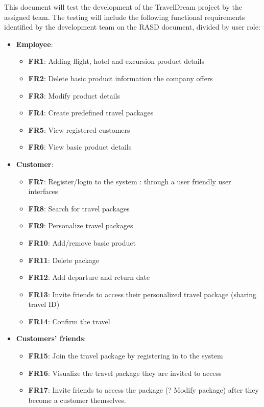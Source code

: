 \documentclass[a4paper,12pt]{book}
\begin{document}
This document will test the development of the TravelDream project by the assigned team. The testing will include the following functional requirements identified by the development team on the RASD document, divided by user role:
\begin{itemize}
  \item \textbf{Employee}:
  \begin{itemize}
    \item \textbf{FR1}: Adding flight, hotel and excursion product details
    \item \textbf{FR2}: Delete basic product information the company offers
    \item \textbf{FR3}: Modify product details
    \item \textbf{FR4}: Create predefined travel packages
    \item \textbf{FR5}: View registered customers
    \item \textbf{FR6}: View basic product details
  \end{itemize}
  \item \textbf{Customer}:
  \begin{itemize}
    \item \textbf{FR7}: Register/login to the system : through a user friendly user interfaces
    \item \textbf{FR8}: Search for travel packages
    \item \textbf{FR9}: Personalize travel packages
    \item \textbf{FR10}: Add/remove basic product
    \item \textbf{FR11}: Delete package
    \item \textbf{FR12}: Add departure and return date
    \item \textbf{FR13}: Invite friends to access their personalized travel package (sharing travel ID)
    \item \textbf{FR14}: Confirm the travel
  \end{itemize}
  \item \textbf{Customers' friends}:
  \begin{itemize}
    \item \textbf{FR15}: Join the travel package by registering in to the system
    \item \textbf{FR16}: Visualize the travel package they are invited to access
    \item \textbf{FR17}: Invite friends to access the package (? Modify package) after they become a customer themselves.
  \end{itemize}
\end{itemize}
\end{document}
